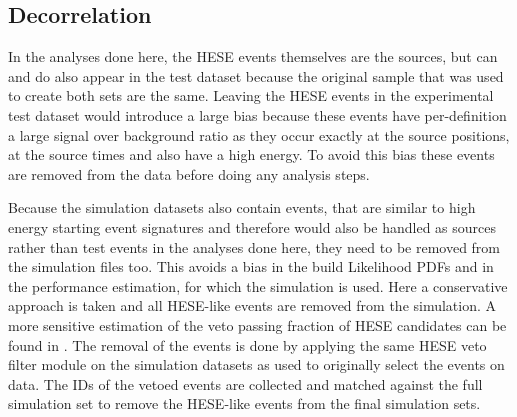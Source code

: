 \subsection{Decorrelation}
In the analyses done here, the HESE events themselves are the sources, but can and do also appear in the test dataset because the original sample that was used to create both sets are the same.
Leaving the HESE events in the experimental test dataset would introduce a large bias because these events have per-definition a large signal over background ratio as they occur exactly at the source positions, at the source times and also have a high energy.
To avoid this bias these events are removed from the data before doing any analysis steps.

Because the simulation datasets also contain events, that are similar to high energy starting event signatures and therefore would also be handled as sources rather than test events in the analyses done here, they need to be removed from the simulation files too.
This avoids a bias in the build Likelihood PDFs and in the performance estimation, for which the simulation is used.
Here a conservative approach is taken and all HESE-like events are removed from the simulation.
A more sensitive estimation of the veto passing fraction of HESE candidates can be found in .
The removal of the events is done by applying the same HESE veto filter module on the simulation datasets as used to originally select the events on data.
The IDs of the vetoed events are collected and matched against the full simulation set to remove the HESE-like events from the final simulation sets.
